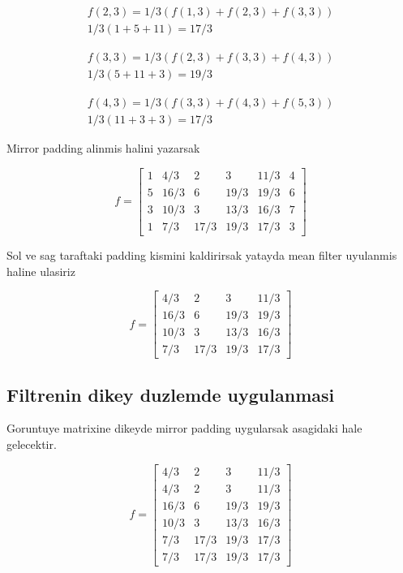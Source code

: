 \documentclass[12pt]{article}
\begin{document}
\begin{equation}
\begin{split}
f(2,3) = 1/3 (f(1,3)+f(2,3)+f(3,3)) \\
1/3 (1+5+11) = 17/3
\end{split}
\end{equation}

\begin{equation}
\begin{split}
f(3,3) = 1/3 (f(2,3)+f(3,3)+f(4,3)) \\
1/3 (5+11+3) = 19/3
\end{split}
\end{equation}

\begin{equation}
\begin{split}
f(4,3) = 1/3 (f(3,3)+f(4,3)+f(5,3)) \\
1/3 (11+3+3) = 17/3
\end{split}
\end{equation}

Mirror padding alinmis halini yazarsak 

$$f = \begin{bmatrix}
1 & 4/3 & 2 & 3 & 11/3 & 4\\ 
5 & 16/3 & 6 & 19/3 & 19/3 & 6\\ 
3 & 10/3 & 3 & 13/3 & 16/3 & 7\\ 
1 & 7/3 & 17/3 & 19/3 & 17/3 & 3
\end{bmatrix}$$

Sol ve sag taraftaki padding kismini kaldirirsak yatayda mean filter uyulanmis haline ulasiriz

$$f = \begin{bmatrix}
4/3 & 2 & 3 & 11/3\\ 
16/3 & 6 & 19/3 & 19/3\\ 
10/3 & 3 & 13/3 & 16/3\\ 
7/3 & 17/3 & 19/3 & 17/3
\end{bmatrix}$$







\subsection{Filtrenin dikey duzlemde uygulanmasi}

Goruntuye matrixine dikeyde mirror padding uygularsak asagidaki hale gelecektir.

$$f = \begin{bmatrix}
4/3 & 2 & 3 & 11/3\\ 
4/3 & 2 & 3 & 11/3\\ 
16/3 & 6 & 19/3 & 19/3\\ 
10/3 & 3 & 13/3 & 16/3\\ 
7/3 & 17/3 & 19/3 & 17/3\\
7/3 & 17/3 & 19/3 & 17/3
\end{bmatrix}$$
\end{document}
